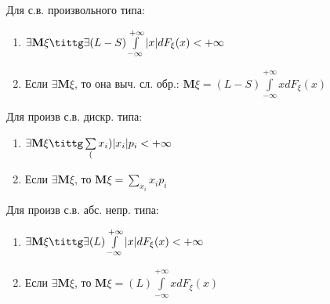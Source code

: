\begin{proofs}

  Для с.в. произвольного типа:
  \begin{enumerate}
    \item $\exists\mathbf{M}\xi \tittg \exists (L-S) \int\limits_{-\infty}^{+\infty} |x| d F_{\xi}(x) < +\infty$
    \item Если $\exists\mathbf{M}\xi$, то она выч. сл. обр.: $\mathbf{M}\xi = (L-S) \int\limits_{-\infty}^{+\infty} x d F_{\xi}(x)$
  \end{enumerate}
  \begin{multicols}{2}
    Для произв с.в. дискр. типа:
    \begin{enumerate}
      \item $\exists\mathbf{M}\xi \tittg \sum\limits_(x_i)|x_i|p_i < +\infty$
      \item Если $\exists\mathbf{M}\xi$, то $\mathbf{M}\xi = \sum\limits_{x_i}x_i p_i$
    \end{enumerate}
  \columnbreak
    Для произв с.в. абс. непр. типа:
    \begin{enumerate}
      \item $\exists\mathbf{M}\xi \tittg \exists (L) \int\limits_{-\infty}^{+\infty} |x| d F_{\xi}(x) < +\infty$
      \item Если $\exists\mathbf{M}\xi$, то $\mathbf{M}\xi = (L) \int\limits_{-\infty}^{+\infty} x d F_{\xi}(x)$
    \end{enumerate}
\end{multicols}
\end{proofs}

